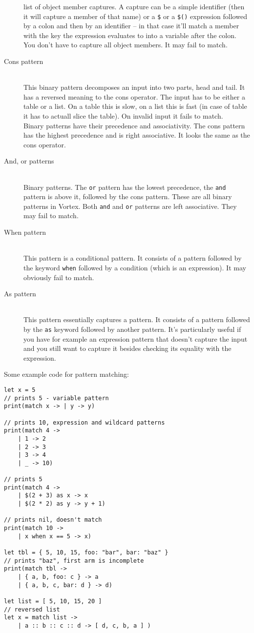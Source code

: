 \documentclass{article}
\begin{document}
\begin{description}
list of object member captures. A capture can be a simple identifier (then
it will capture a member of that name) or a \verb|$| or a \verb|$()| expression
followed by a colon and then by an identifier -- in that case it'll match
a member with the key the expression evaluates to into a variable after the
colon. You don't have to capture all object members. It may fail to match.
\item[Cons pattern] \hfill \\
This binary pattern decomposes an input into two parts, head and tail. It has
a reversed meaning to the cons operator. The input has to be either a table
or a list. On a table this is slow, on a list this is fast (in case of table
it has to actuall slice the table). On invalid input it fails to match.\\
Binary patterns have their precedence and associativity. The cons pattern has
the highest precedence and is right associative. It looks the same as the cons
operator.
\item[And, or patterns] \hfill \\
Binary patterns. The \verb|or| pattern has the lowest precedence, the
\verb|and| pattern is above it, followed by the cons pattern. These are all
binary patterns in Vortex. Both \verb|and| and \verb|or| patterns are left
associative. They may fail to match.
\item[When pattern] \hfill \\
This pattern is a conditional pattern. It consists of a pattern followed by
the keyword \verb|when| followed by a condition (which is an expression).
It may obviously fail to match.
\item[As pattern] \hfill \\
This pattern essentially captures a pattern. It consists of a pattern followed
by the \verb|as| keyword followed by another pattern. It's particularly useful
if you have for example an expression pattern that doesn't capture the input
and you still want to capture it besides checking its equality with the
expression.
\end{description}
Some example code for pattern matching:
\begin{lstlisting}[language=vortex]
let x = 5
// prints 5 - variable pattern
print(match x -> | y -> y)

// prints 10, expression and wildcard patterns
print(match 4 ->
    | 1 -> 2
    | 2 -> 3
    | 3 -> 4
    | _ -> 10)

// prints 5
print(match 4 ->
    | $(2 + 3) as x -> x
    | $(2 * 2) as y -> y + 1)

// prints nil, doesn't match
print(match 10 ->
    | x when x == 5 -> x)

let tbl = { 5, 10, 15, foo: "bar", bar: "baz" }
// prints "baz", first arm is incomplete
print(match tbl ->
    | { a, b, foo: c } -> a
    | { a, b, c, bar: d } -> d)

let list = [ 5, 10, 15, 20 ]
// reversed list
let x = match list ->
    | a :: b :: c :: d -> [ d, c, b, a ] )
\end{lstlisting}
\end{document}
